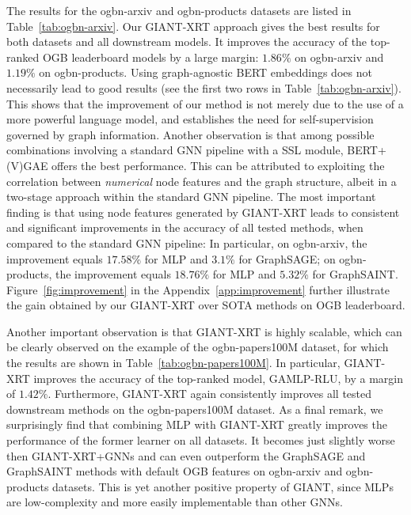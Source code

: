 \documentclass{article} \usepackage{iclr2022_conference,times}
\begin{document}
The results for the ogbn-arxiv and ogbn-products datasets are listed in Table~\ref{tab:ogbn-arxiv}. Our GIANT-XRT approach gives the best results for both datasets and all downstream models. It improves the accuracy of the top-ranked OGB leaderboard models by a large margin:  $1.86\%$ on ogbn-arxiv and $1.19\%$ on ogbn-products. Using graph-agnostic BERT embeddings does not necessarily lead to good results (see the first two rows in Table~\ref{tab:ogbn-arxiv}). This shows that the improvement of our method is not merely due to the use of a more powerful language model, and establishes the need for self-supervision governed by graph information.
Another observation is that among possible combinations involving a standard GNN pipeline with a SSL module, BERT+(V)GAE offers the best performance. This can be attributed to exploiting the correlation between \emph{numerical} node features and the graph structure, albeit in a two-stage approach within the standard GNN pipeline. The most important finding is that using node features generated by GIANT-XRT leads to consistent and significant improvements in the accuracy of all tested methods, when compared to the standard GNN pipeline: In particular, on ogbn-arxiv, the improvement equals $17.58\%$ for MLP and $3.1\%$ for GraphSAGE; on ogbn-products, the improvement equals $18.76\%$ for MLP and $5.32\%$ for GraphSAINT. Figure~\ref{fig:improvement} in the Appendix~\ref{app:improvement} further illustrate the gain obtained by our GIANT-XRT over SOTA methods on OGB leaderboard.

Another important observation is that GIANT-XRT is highly scalable, which can be clearly observed on the example of the ogbn-papers100M dataset, for which the results are shown in Table~\ref{tab:ogbn-papers100M}. In particular, GIANT-XRT improves the accuracy of the top-ranked model, GAMLP-RLU, by a margin of $1.42\%$. Furthermore, GIANT-XRT again consistently improves all tested downstream methods on the ogbn-papers100M dataset. As a final remark, we surprisingly find that combining MLP with GIANT-XRT greatly improves the performance of the former learner on all datasets. It becomes just slightly worse then GIANT-XRT+GNNs and can even outperform the GraphSAGE and GraphSAINT methods with default OGB features on ogbn-arxiv and ogbn-products datasets. This is yet another positive property of GIANT, since MLPs are low-complexity and more easily implementable than other GNNs.
\end{document}
